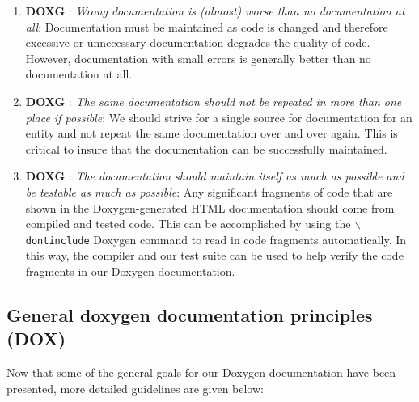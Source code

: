 \begin{enumerate}
{}\item{}\textbf{DOXG }:
{}\textit{Wrong documentation is (almost) worse than no documentation at
all}: Documentation must be maintained as code is changed and therefore
excessive or unnecessary documentation degrades the quality of code.  However,
documentation with small errors is generally better than no documentation at
all.

{}\item{}\textbf{DOXG }:
{}\textit{The same documentation should not be repeated in more than one
place if possible}: We should strive for a single source for documentation for
an entity and not repeat the same documentation over and over again.  This is
critical to insure that the documentation can be successfully maintained.

{}\item{}\textbf{DOXG }:
{}\textit{The documentation should maintain itself as much as possible
and be testable as much as possible}: Any significant fragments of code that
are shown in the Doxygen-generated HTML documentation should come from
compiled and tested code.  This can be accomplished by using the
{}\texttt{$\backslash$dontinclude} Doxygen command to read in code fragments
automatically.  In this way, the compiler and our test suite can be used to
help verify the code fragments in our Doxygen documentation.

\end{enumerate}

%
\subsection{General doxygen documentation principles (DOX)}
%

Now that some of the general goals for our Doxygen documentation have been
presented, more detailed guidelines are given below:

